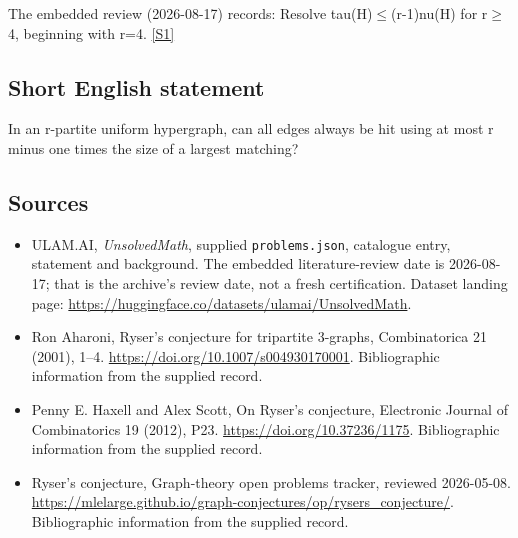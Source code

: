 \documentclass[11pt,a4paper]{article}
\newcommand{\sref}[2]{\hyperlink{source:#1:#2}{[S#2]}}
\begin{document}
The embedded review (2026-08-17) records: Resolve tau(H)\ensuremath{≤}(r-1)nu(H) for r\ensuremath{≥}4, beginning with r=4. \sref{statement}{1}

\subsection{Short English statement}

In an r-partite uniform hypergraph, can all edges always be hit using at most r minus one times the size of a largest matching?

\subsection{Sources}

{\small

\begin{itemize}

\item[\hypertarget{source:statement:1}{S1}] ULAM.AI, \emph{UnsolvedMath}, supplied \texttt{problems.json}, catalogue entry, statement and background. The embedded literature-review date is 2026-08-17; that is the archive’s review date, not a fresh certification. Dataset landing page: \url{https://huggingface.co/datasets/ulamai/UnsolvedMath}.

\item[\hypertarget{source:statement:2}{S2}] Ron Aharoni, Ryser's conjecture for tripartite 3-graphs, Combinatorica 21 (2001), 1–4. \url{https://doi.org/10.1007/s004930170001}. Bibliographic information from the supplied record.

\item[\hypertarget{source:statement:3}{S3}] Penny E. Haxell and Alex Scott, On Ryser's conjecture, Electronic Journal of Combinatorics 19 (2012), P23. \url{https://doi.org/10.37236/1175}. Bibliographic information from the supplied record.

\item[\hypertarget{source:statement:4}{S4}] Ryser's conjecture, Graph-theory open problems tracker, reviewed 2026-05-08. \url{https://mlelarge.github.io/graph-conjectures/op/rysers_conjecture/}. Bibliographic information from the supplied record.

\end{itemize}

}

\label{end:statement}
\end{document}

